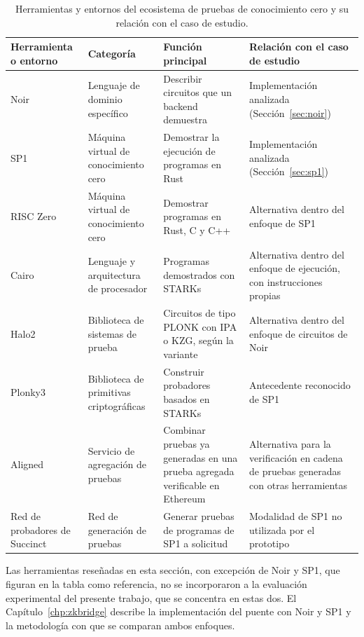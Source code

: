 \begin{table}[htbp]
	\centering
	\caption{Herramientas y entornos del ecosistema de pruebas de conocimiento cero y su relación con
	el caso de estudio.}
	\label{tab:otros_zk}
	\small
	\begin{tabular}{>{\raggedright\arraybackslash}p{2.6cm} >{\raggedright\arraybackslash}p{3.4cm} >{\raggedright\arraybackslash}p{4.3cm} >{\raggedright\arraybackslash}p{4.3cm}}
		\toprule
		\textbf{Herramienta o entorno} & \textbf{Categoría} & \textbf{Función principal} &
		\textbf{Relación con el caso de estudio} \\
		\midrule
		Noir & Lenguaje de dominio específico & Describir circuitos que un backend demuestra &
		Implementación analizada (Sección~\ref{sec:noir}) \\
		\addlinespace
		SP1 & Máquina virtual de conocimiento cero & Demostrar la ejecución de programas en Rust &
		Implementación analizada (Sección~\ref{sec:sp1}) \\
		\addlinespace
		RISC Zero & Máquina virtual de conocimiento cero & Demostrar programas en Rust, C y C++ & Alternativa dentro del enfoque de SP1 \\
		\addlinespace
		Cairo & Lenguaje y arquitectura de procesador & Programas demostrados con STARKs & Alternativa dentro del enfoque de ejecución, con instrucciones propias \\
		\addlinespace
		Halo2 & Biblioteca de sistemas de prueba & Circuitos de tipo PLONK con IPA o KZG, según la variante & Alternativa dentro del enfoque de circuitos de Noir \\
		\addlinespace
		Plonky3 & Biblioteca de primitivas criptográficas & Construir probadores basados en STARKs &
		Antecedente reconocido de SP1 \\
		\addlinespace
		Aligned & Servicio de agregación de pruebas & Combinar pruebas ya generadas en una prueba agregada
		verificable en Ethereum & Alternativa para la verificación en cadena de pruebas generadas con
		otras herramientas \\
		\addlinespace
		Red de probadores de Succinct & Red de generación de pruebas & Generar pruebas de programas de
		SP1 a solicitud & Modalidad de SP1 no utilizada por el prototipo \\
		\bottomrule
	\end{tabular}
\end{table}

Las herramientas reseñadas en esta sección, con excepción de Noir y SP1, que figuran en la tabla
como referencia, no se incorporaron a la evaluación experimental del presente trabajo, que se
concentra en estas dos. El Capítulo~\ref{chp:zkbridge} describe la implementación del puente con
Noir y SP1 y la metodología con que se comparan ambos enfoques.
